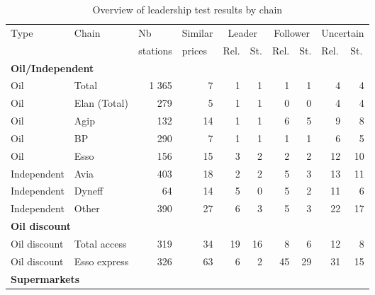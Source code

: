 \documentclass[english]{article}
\begin{document}
\begin{table}[hbtp]
\begin{threeparttable}
\renewcommand{\arraystretch}{0.8} %
\caption{Overview of leadership test results by chain}
\label{tab:stats_leadership}
    \begin{tabular}{llr|r|rr|rr|rr}
\toprule
\toprule
    Type   &  Chain     & \multicolumn{1}{l|}{Nb} & \multicolumn{1}{l|}{Similar} & \multicolumn{2}{c|}{Leader} & \multicolumn{2}{c|}{Follower} & \multicolumn{2}{c}{Uncertain} \\
           &            & \multicolumn{1}{l|}{stations} & \multicolumn{1}{l|}{prices} & \multicolumn{1}{l}{Rel.} & \multicolumn{1}{l|}{St.} & \multicolumn{1}{l}{Rel.} & \multicolumn{1}{l|}{St.} & \multicolumn{1}{l}{Rel.} & \multicolumn{1}{l}{St.} \\
    \midrule
    \multicolumn{2}{l}{\textbf{Oil/Independent}}  &       &       &       &       &       &       &       &  \\
    Oil   & Total & 1 365 & 7     & 1     & 1     & 1     & 1     & 4     & 4 \\
    Oil   & Elan (Total) & 279   & 5     & 1     & 1     & 0     & 0     & 4     & 4 \\
    Oil   & Agip  & 132   & 14    & 1     & 1     & 6     & 5     & 9     & 8 \\
    Oil  & BP    & 290   & 7     & 1     & 1     & 1     & 1     & 6     & 5 \\
    Oil  & Esso  & 156   & 15    & 3     & 2     & 2     & 2     & 12    & 10 \\
    Independent & Avia  & 403   & 18    & 2     & 2     & 5     & 3     & 13    & 11 \\
    Independent & Dyneff & 64    & 14    & 5     & 0     & 5     & 2     & 11    & 6 \\
    Independent & Other & 390   & 27    & 6     & 3     & 5     & 3     & 22    & 17 \\
    \midrule
    \multicolumn{2}{l}{\textbf{Oil discount}}       &       &       &       &       &       &       &       &  \\
    Oil discount & Total access & 319   & 34    & 19    & 16    & 8     & 6     & 12    & 8 \\
    Oil discount & Esso express & 326   & 63    & 6     & 2     & 45    & 29    & 31    & 15 \\
    \midrule
    \multicolumn{2}{l}{\textbf{Supermarkets}} &       &       &       &       &       &       &       &  \\

\end{tabular}
\end{threeparttable}
\end{table}
\end{document}
